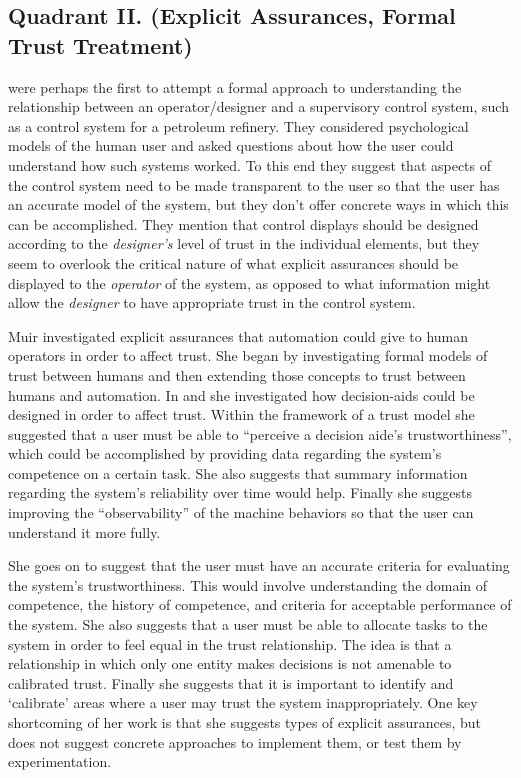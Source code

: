 \subsection{Quadrant II. (Explicit Assurances, Formal Trust Treatment)}\label{sec:q2}
\citet{Sheridan1984-kx} were perhaps the first to attempt a formal approach to understanding the relationship between an operator/designer and a supervisory control system, such as a control system for a petroleum refinery. They considered psychological models of the human user and asked questions about how the user could understand how such systems worked. To this end they suggest that aspects of the control system need to be made transparent to the user so that the user has an accurate model of the system, but they don't offer concrete ways in which this can be accomplished. They mention that control displays should be designed according to the \emph{designer's} level of trust in the individual elements, but they seem to overlook the critical nature of what explicit assurances should be displayed to the \emph{operator} of the system, as opposed to what information might allow the \emph{designer} to have appropriate trust in the control system.

Muir investigated explicit assurances that automation could give to human operators in order to affect trust. She began by investigating formal models of trust between humans and then extending those concepts to trust between humans and automation. In \cite{Muir1987-mk} and \cite{Muir1994-ow} she investigated how decision-aids could be designed in order to affect trust. Within the framework of a trust model she suggested that a user must be able to ``perceive a decision aide's trustworthiness'', which could be accomplished by providing data regarding the system's competence on a certain task. She also suggests that summary information regarding the system's reliability over time would help. Finally she suggests improving the ``observability'' of the machine behaviors so that the user can understand it more fully.

She goes on to suggest that the user must have an accurate criteria for evaluating the system's trustworthiness. This would involve understanding the domain of competence, the history of competence, and criteria for acceptable performance of the system. She also suggests that a user must be able to allocate tasks to the system in order to feel equal in the trust relationship. The idea is that a relationship in which only one entity makes decisions is not amenable to calibrated trust. Finally she suggests that it is important to identify and `calibrate' areas where a user may trust the system inappropriately. One key shortcoming of her work is that she suggests types of explicit assurances, but does not suggest concrete approaches to implement them, or test them by experimentation.


